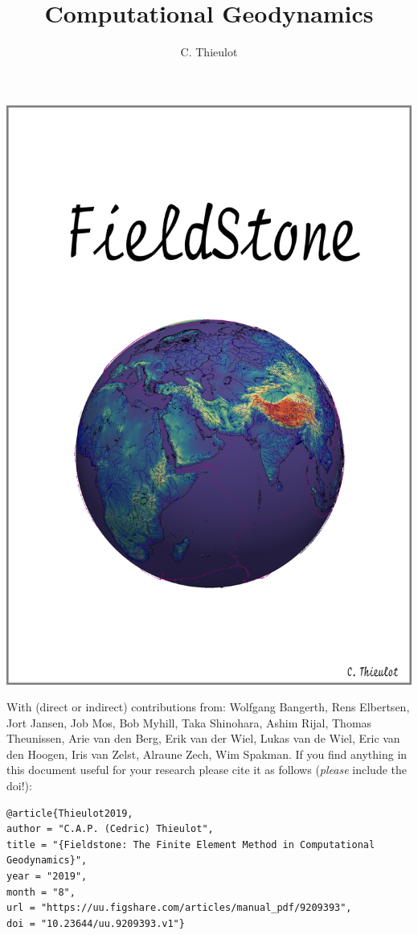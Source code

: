 \documentclass[a4paper]{article}
\title{Computational Geodynamics}
\author{C. Thieulot}
\numberwithin{equation}{section}
\begin{document}
\thispagestyle{empty}
\includegraphics[width=0.95\linewidth]{images/frontpage/frontpage.png}

{\scriptsize With (direct or indirect) contributions from: 
Wolfgang Bangerth, 
Rens Elbertsen,
Jort Jansen,
Job Mos, 
Bob Myhill,
Taka Shinohara, 
Ashim Rijal,
Thomas Theunissen,
Arie van den Berg,
Erik van der Wiel, 
Lukas van de Wiel, 
Eric van den Hoogen, 
Iris van Zelst,
Alraune Zech, 
Wim Spakman.}
\newpage
If you find anything in this document useful for your research please cite it 
as follows ({\it please} include the doi!):

\begin{verbatim}
@article{Thieulot2019,
author = "C.A.P. (Cedric) Thieulot",
title = "{Fieldstone: The Finite Element Method in Computational Geodynamics}",
year = "2019",
month = "8",
url = "https://uu.figshare.com/articles/manual_pdf/9209393",
doi = "10.23644/uu.9209393.v1"}
\end{verbatim}
\end{document}
